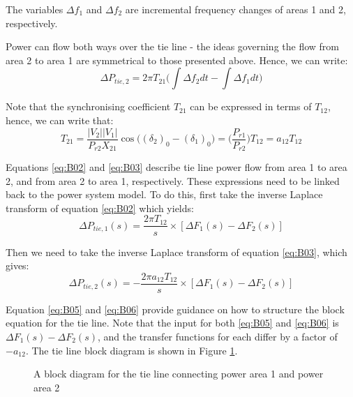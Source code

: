 The variables $\Delta f_1$ and $\Delta f_2$ are incremental frequency changes of areas 1 and 2, respectively.

Power can flow both ways over the tie line - the ideas governing the flow from area 2 to area 1 are symmetrical to those presented above. Hence, we can write:
\begin{equation}
	\Delta P_{tie, 2} = 2 \pi T_{21} \bigg( \int \Delta f_2 dt - \int \Delta f_1 dt \bigg) \label{eq:B03}
\end{equation}

Note that the synchronising coefficient $T_{21}$ can be expressed in terms of $T_{12}$, hence, we can write that:
\begin{equation}
	T_{21} = \frac{|V_2||V_1|}{P_{r2} X_{21}} \cos \big( (\delta_2)_0 - (\delta_1)_0 \big) = \bigg( \frac{P_{r1}}{P_{r2}} \bigg) T_{12} = a_{12} T_{12} \label{eq:B04}
\end{equation}

Equations \ref{eq:B02} and \ref{eq:B03} describe tie line power flow from area 1 to area 2, and from area 2 to area 1, respectively. These expressions need to be linked back to the power system model. To do this, first take the inverse Laplace transform of equation \ref{eq:B02} which yields:
\begin{equation}
	\Delta P_{tie,1}(s) = \frac{2 \pi T_{12}}{s} \times [\Delta F_1(s) - \Delta F_2(s)] \label{eq:B05}
\end{equation}

Then we need to take the inverse Laplace transform of equation \ref{eq:B03}, which gives:
\begin{equation}
	\Delta P_{tie,2}(s) = - \frac{2 \pi a_{12} T_{12}}{s} \times [\Delta F_1(s) - \Delta F_2(s)] \label{eq:B06}
\end{equation}

Equation \ref{eq:B05} and \ref{eq:B06} provide guidance on how to structure the block equation for the tie line. Note that the input for both \ref{eq:B05} and \ref{eq:B06} is $\Delta F_1(s) - \Delta F_2(s)$, and the transfer functions for each differ by a factor of $-a_{12}$. The tie line block diagram is shown in Figure \ref{fig:B101_tie_line_model}.

\begin{figure}[h]
	\centering
	
	\caption{A block diagram for the tie line connecting power area 1 and power area 2}
	\label{fig:B101_tie_line_model}
\end{figure}